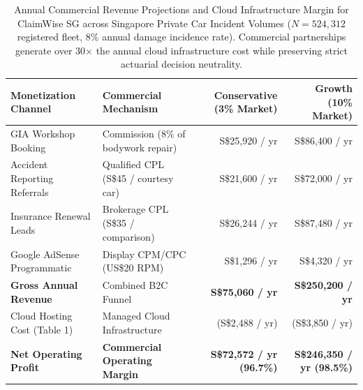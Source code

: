 \begin{table}[h]
\centering
\small
\begin{tabular}{llrr}
\hline
\textbf{Monetization Channel} & \textbf{Commercial Mechanism} & \textbf{Conservative (3\% Market)} & \textbf{Growth (10\% Market)} \\
\hline
GIA Workshop Booking         & Commission (8\% of bodywork repair) & S\$25,920 / yr                     & S\$86,400 / yr                \\
Accident Reporting Referrals  & Qualified CPL (S\$45 / courtesy car) & S\$21,600 / yr                     & S\$72,000 / yr                \\
Insurance Renewal Leads       & Brokerage CPL (S\$35 / comparison)   & S\$26,244 / yr                     & S\$87,480 / yr                \\
Google AdSense Programmatic   & Display CPM/CPC (US\$20 RPM)         & S\$1,296 / yr                      & S\$4,320 / yr                 \\
\hline
\textbf{Gross Annual Revenue} & Combined B2C Funnel                  & \textbf{S\$75,060 / yr}            & \textbf{S\$250,200 / yr}      \\
Cloud Hosting Cost (Table 1)  & Managed Cloud Infrastructure         & (S\$2,488 / yr)                    & (S\$3,850 / yr)               \\
\hline
\textbf{Net Operating Profit} & \textbf{Commercial Operating Margin} & \textbf{S\$72,572 / yr (96.7\%)}   & \textbf{S\$246,350 / yr (98.5\%)} \\
\hline
\end{tabular}
\caption{Annual Commercial Revenue Projections and Cloud Infrastructure Margin for ClaimWise SG across Singapore Private Car Incident Volumes ($N = 524,312$ registered fleet, 8\% annual damage incidence rate). Commercial partnerships generate over 30$\times$ the annual cloud infrastructure cost while preserving strict actuarial decision neutrality.}
\label{tab:advertising_monetization}
\end{table}

